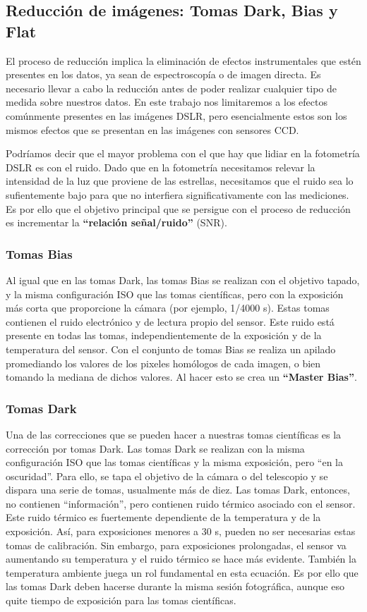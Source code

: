 \documentclass[a4paper, 12pt]{article}
\begin{document}
\subsection{Reducción de imágenes: Tomas Dark, Bias y Flat}
\label{sec:tomas}
El proceso de reducción implica la eliminación de efectos instrumentales que estén presentes en los datos, ya sean de espectroscopía o de imagen directa. Es necesario llevar a cabo la reducción antes de poder realizar cualquier tipo de medida sobre nuestros datos. En este trabajo nos limitaremos a los efectos comúnmente presentes en las imágenes DSLR, pero esencialmente estos son los mismos efectos que se presentan en las imágenes con sensores CCD.

Podríamos decir que el mayor problema con el que hay que lidiar en la fotometría DSLR es con el ruido. Dado que en la fotometría necesitamos relevar la intensidad de la luz que proviene de las estrellas, necesitamos que el ruido sea lo sufientemente bajo para que no interfiera significativamente con las mediciones. Es por ello que el objetivo principal que se persigue con el proceso de reducción es incrementar la {\bf ``relación señal/ruido''} (SNR).

\subsubsection{Tomas Bias}
\label{sec:bias}
Al igual que en las tomas Dark, las tomas Bias se realizan con el objetivo tapado, y la misma configuración ISO que las tomas científicas, pero con la exposición más corta que proporcione la cámara (por ejemplo, 1/4000 s). Estas tomas contienen el ruido electrónico y de lectura propio del sensor. Este ruido está presente en todas las tomas, independientemente de la exposición y de la temperatura del sensor. Con el conjunto de tomas Bias se realiza un apilado promediando los valores de los pixeles homólogos de cada imagen, o bien tomando la mediana de dichos valores. Al hacer esto se crea un \textbf{``Master Bias''}.

\subsubsection{Tomas Dark}
Una de las correcciones que se pueden hacer a nuestras tomas científicas es la corrección por tomas Dark. Las tomas Dark se realizan con la misma configuración ISO que las tomas científicas y la misma exposición, pero ``en la oscuridad''. Para ello, se tapa el objetivo de la cámara o del telescopio y se dispara una serie de tomas, usualmente más de diez. Las tomas Dark, entonces, no contienen ``información'', pero contienen ruido térmico asociado con el sensor. Este ruido térmico es fuertemente dependiente de la temperatura y de la exposición. Así, para exposiciones menores a 30 s, pueden no ser necesarias estas tomas de calibración. Sin embargo, para exposiciones prolongadas, el sensor va aumentando su temperatura y el ruido térmico se hace más evidente. También la temperatura ambiente juega un rol fundamental en esta ecuación. Es por ello que las tomas Dark deben hacerse durante la misma sesión fotográfica, aunque eso quite tiempo de exposición para las tomas científicas.
\end{document}
